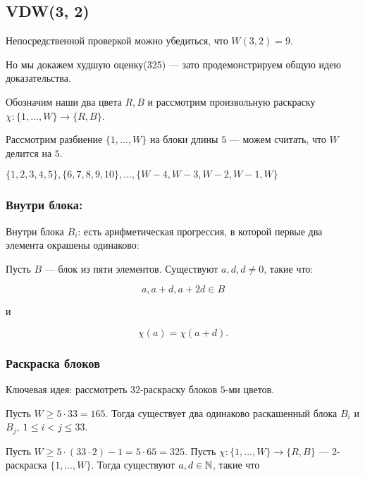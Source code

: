 \begin{normalsize}

\subsection{VDW(3, 2)}
    
Непосредственной проверкой можно убедиться, что $W(3, 2) = 9$.

Но мы докажем худшую оценку(325) --- зато продемонстрируем общую идею доказательства.

Обозначим наши два цвета $R, B$ и рассмотрим произвольную раскраску $\chi: \{1, \ldots, W\} \to \{R, B\}$.

Рассмотрим разбиение $\{1, \ldots, W\}$ на блоки длины $5$ --- можем считать, что $W$ делится на $5$.

$\{1, 2, 3, 4, 5\}, \{6, 7, 8, 9, 10\}, \ldots, \{W-4, W-3, W-2, W-1, W\}$

\subsubsection*{Внутри блока:}

\begin{statement}
    \label{statement:vdw32:1}
    Внутри блока $B_i$: есть арифметическая прогрессия, в которой первые два элемента окрашены одинаково:

    Пусть $B$ --- блок из пяти элементов. Существуют $a, d, d \neq 0$, такие что:

    \[ a, a + d, a + 2d \in B \]

    и

    \[ \chi(a) = \chi(a + d). \]
\end{statement}

\subsubsection*{Раскраска блоков}

Ключевая идея: рассмотреть $32$-раскраску блоков $5$-ми цветов.

\begin{lemma}
    Пусть $W \geq 5 \cdot 33 = 165$. Тогда существует два одинаково раскашенный блока $B_i$ и $B_j,~1 \leq i < j \leq 33$.
\end{lemma}

\begin{theorem}
    Пусть $W \geq 5 \cdot (33 \cdot 2) - 1 = 5 \cdot 65 = 325$. Пусть $\chi: \{1, \ldots, W\} \to \{R, B\}$ --- 2-раскраска $\{1, \ldots, W\}$. Тогда существуют $a, d \in \mathbb{N}$, такие что 


\end{theorem}
\end{normalsize}
